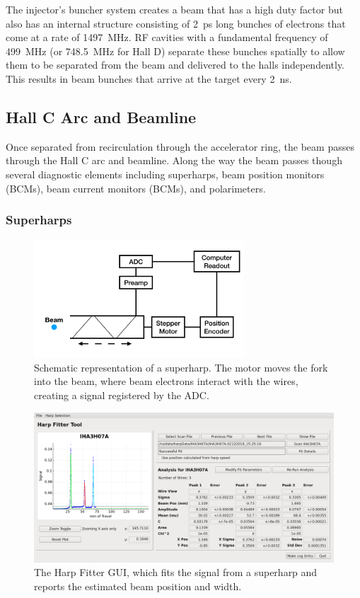 The injector's buncher system creates a beam that has a high duty factor but
also has an internal structure consisting of \SI{2}{ps} long bunches of
electrons that come at a rate of \SI{1497}{MHz}.
RF cavities with a fundamental frequency of \SI{499}{MHz} (or \SI{748.5}{MHz}
for Hall D) separate these bunches spatially to allow them to be separated from
the beam and delivered to the halls independently.
This results in beam bunches that arrive at the target every \SI{2}{ns}.

\subsection{Hall C Arc and Beamline}
Once separated from recirculation through the accelerator ring, the beam passes
through the Hall C arc and beamline.
Along the way the beam passes though several diagnostic elements including
superharps, beam position monitors (BCMs), beam current monitors (BCMs), and
polarimeters.


\subsubsection{Superharps}
\begin{figure}[!h]
    \centering
    \includegraphics[width=0.7\textwidth]{chap3/Superharp_diagram.pdf}
    \caption{Schematic representation of a superharp. The motor moves the fork
             into the beam, where beam electrons interact with the wires,
             creating a signal registered by the ADC.}
    \label{fig:superharp_diagram}
\end{figure}
\begin{figure}[!h]
    \centering
    \includegraphics[width=1.0\textwidth]{chap3/harpFitter.png}
    \caption{The Harp Fitter GUI, which fits the signal from a superharp and
             reports the estimated beam position and width.
            }
    \label{fig:harp_fitter}
\end{figure}

